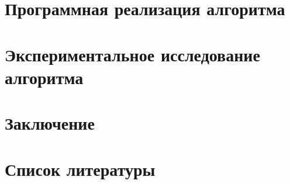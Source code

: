 \documentclass{article}
\begin{document}
{\small
}

\section{Программная реализация алгоритма}

\section{Экспериментальное исследование алгоритма}

\section{Заключение}


\newpage
\section*{Список литературы}

\printbibliography
\end{document}
